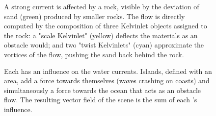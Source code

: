\begin{figure}
\caption{A strong current is affected by a rock, visible by the deviation of sand (green) produced by smaller rocks. The flow is directly computed by the composition of three Kelvinlet objects assigned to the rock: a "scale Kelvinlet" (yellow) deflects the materials as an obstacle would; and two "twist Kelvinlets" (cyan) approximate the vortices of the flow, pushing the sand back behind the rock.}
\label{fig:env-obj-rock-with-kelvinlets}
\end{figure}

\begin{figure}
    \caption{Each  has an influence on the water currents. Islands, defined with an area, add a force towards themselves (waves crashing on coasts) and simultaneously a force towards the ocean that acts as an obstacle flow. The resulting vector field of the scene is the sum of each 's influence.}
    \label{fig:env-obj-island-flowfield}
\end{figure}


